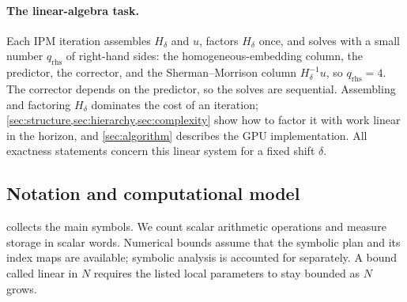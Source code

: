 \paragraph{The linear-algebra task.}
Each IPM iteration assembles $H_\delta$ and $u$, factors $H_\delta$ once, and
solves with a small number $q_{\mathrm{rhs}}$ of right-hand sides: the
homogeneous-embedding column, the predictor, the corrector, and the
Sherman--Morrison column $H_\delta^{-1}u$, so $q_{\mathrm{rhs}}=4$. The corrector
depends on the predictor, so the solves are sequential. Assembling and factoring
$H_\delta$ dominates the cost of an iteration;
\cref{sec:structure,sec:hierarchy,sec:complexity} show how to factor it with work
linear in the horizon, and \cref{sec:algorithm} describes the GPU implementation.
All exactness statements concern this linear system for a fixed shift $\delta$.

\subsection{Notation and computational model}

 collects the main symbols. We count scalar arithmetic
operations and measure storage in scalar words. Numerical bounds assume that the
symbolic plan and its index maps are available; symbolic analysis is accounted for
separately. A bound called linear in $N$ requires the listed local parameters to
stay bounded as $N$ grows.

